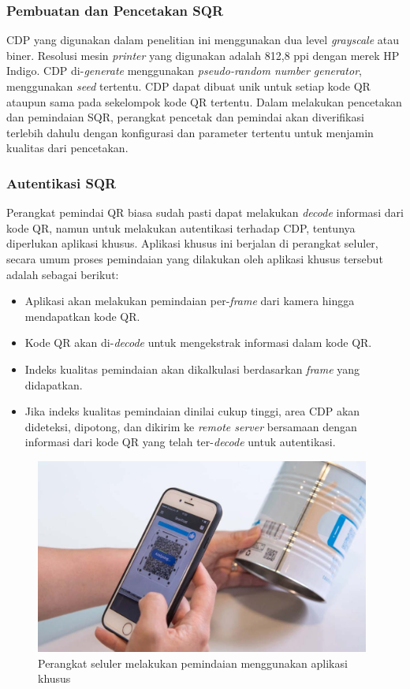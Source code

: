 \subsubsection{Pembuatan dan Pencetakan SQR}
CDP yang digunakan dalam penelitian ini menggunakan dua level \emph{grayscale} atau biner. Resolusi mesin \emph{printer} yang digunakan adalah 812,8 ppi dengan
merek HP Indigo. CDP di-\emph{generate} menggunakan \emph{pseudo-random number generator}, menggunakan \emph{seed} tertentu. CDP dapat dibuat unik untuk setiap
kode QR ataupun sama pada sekelompok kode QR tertentu. Dalam melakukan pencetakan dan pemindaian SQR, perangkat pencetak dan pemindai akan diverifikasi
terlebih dahulu dengan konfigurasi dan parameter tertentu untuk menjamin kualitas dari pencetakan.

\subsubsection{Autentikasi SQR}
Perangkat pemindai QR biasa sudah pasti dapat melakukan \emph{decode} informasi dari kode QR, namun untuk melakukan autentikasi terhadap CDP, tentunya
diperlukan aplikasi khusus. Aplikasi khusus ini berjalan di perangkat seluler, secara umum proses pemindaian yang dilakukan oleh aplikasi khusus tersebut
adalah sebagai berikut:

\begin{itemize}
	\item Aplikasi akan melakukan pemindaian per-\emph{frame} dari kamera hingga mendapatkan kode QR.
	\item Kode QR akan di-\emph{decode} untuk mengekstrak informasi dalam kode QR.
	\item Indeks kualitas pemindaian akan dikalkulasi berdasarkan \emph{frame} yang didapatkan.
	\item Jika indeks kualitas pemindaian dinilai cukup tinggi, area CDP akan dideteksi, dipotong, dan dikirim ke \emph{remote server} bersamaan dengan informasi dari
	      kode QR yang telah ter-\emph{decode} untuk autentikasi.
\end{itemize}

\begin{figure}[!ht]
	\centering
	\includegraphics[width=11cm]{contents/chapter-2/2-pemindaiansqr.jpg}
	\caption[Perangkat seluler melakukan pemindaian menggunakan aplikasi khusus]{Perangkat seluler melakukan pemindaian menggunakan aplikasi khusus \cite{picard2021counterfeit}}
	\label{Fig: 2-pemindaisqr}
\end{figure}

